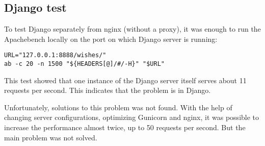 \subsection{Django test}
To test Django separately from nginx (without a proxy), it was enough to run the Apachebench locally on the port on which
Django server is running:

\begin{lstlisting}
URL="127.0.0.1:8888/wishes/"
ab -c 20 -n 1500 "${HEADERS[@]/#/-H}" "$URL"
\end{lstlisting}

This test showed that one instance of the Django server itself serves about 11 requests per second. This indicates that
the problem is in Django.

Unfortunately, solutions to this problem was not found. With the help of changing server configurations, optimizing
Gunicorn and nginx, it was possible to increase the performance almost twice, up to 50 requests per second. But the main
problem was not solved.

